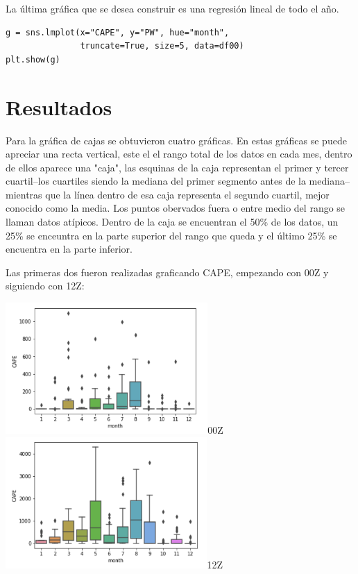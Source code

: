 \documentclass{article}
\begin{document}
La última gráfica que se desea construir es una regresión lineal de todo el año.

\begin{verbatim}
g = sns.lmplot(x="CAPE", y="PW", hue="month",
               truncate=True, size=5, data=df00)
plt.show(g)
\end{verbatim}

\section{Resultados}
Para la gráfica de cajas se obtuvieron cuatro gráficas. En estas gráficas se puede apreciar una recta vertical, este el el rango total de los datos en cada mes, dentro de ellos aparece una "caja", las esquinas de la caja representan el primer y tercer cuartil--los cuartiles siendo la mediana del primer segmento antes de la mediana--mientras que la línea dentro de esa caja representa el segundo cuartil, mejor conocido como la media. Los puntos obervados fuera o entre medio del rango se llaman datos atípicos. Dentro de la caja se encuentran el 50\% de los datos, un 25\% se enceuntra en la parte superior del rango que queda y el último 25\% se encuentra en la parte inferior.

Las primeras dos fueron realizadas graficando CAPE, empezando con 00Z y siguiendo con 12Z:

	\begin{center}
    \includegraphics[height=5cm]{cajaCape00.png}{00Z}
    \includegraphics[height=5cm]{cajaCape12.png}{12Z}
    \end{center}
\end{document}
